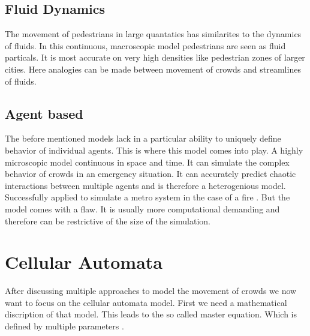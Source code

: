 \subsection{Fluid Dynamics}
The movement of pedestrians in large quantaties has similarites to the dynamics of fluids. 
In this continuous, macroscopic model pedestrians are seen as fluid particals. 
It is most accurate on very high densities like pedestrian zones of larger cities. 
Here analogies can be made between movement of crowds and streamlines of fluids.

\subsection{Agent based}
The before mentioned models lack in a particular ability to uniquely define behavior of individual agents. 
This is where this model comes into play. 
A highly microscopic model continuous in space and time. 
It can simulate the complex behavior of crowds in an emergency situation. 
It can accurately predict chaotic interactions between multiple agents and is therefore a heterogenious model. 
Successfully applied to simulate a metro system in the case of a fire \cite{zarboutis2004searching}.
But the model comes with a flaw. 
It is usually more computational demanding and therefore can be restrictive of the size of the simulation. 


\newpage
\section{Cellular Automata}
After discussing multiple approaches to model the movement of crowds we now want to focus on the cellular automata model. 
First we need a mathematical discription of that model. This leads to the so called master equation. 
Which is defined by multiple parameters \cite{Michi}.

